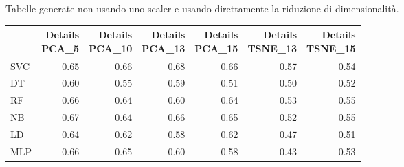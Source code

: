 \documentclass[12pt,italian]{report}
\begin{document}
Tabelle generate non usando uno scaler e usando direttamente la riduzione di dimensionalità.
\begin{table}[h]
	\begin{center}
		\begin{adjustbox}{max width=\textwidth}
			\begin{tabular}{lrrrrrr}
				\toprule
				{} &  \thead{Details\\PCA\_5} &  \thead{Details\\PCA\_10} &  \thead{Details\\PCA\_13} &  \thead{Details\\PCA\_15} &  \thead{Details\\TSNE\_13} &  \thead{Details\\TSNE\_15} \\
				\midrule
				SVC &                  0.65 &                   0.66 &                   \cellcolor{orange}0.68 &                   0.66 &                    0.57 &                    0.54 \\
				DT  &                  \cellcolor{cyan}0.60 &                   0.55 &                   0.59 &                   0.51 &                    0.50 &                    0.52 \\
				RF  &                  \cellcolor{cyan}0.66 &                   0.64 &                   0.60 &                   0.64 &                    0.53 &                    0.55 \\
				NB  &                  \cellcolor{cyan}0.67 &                   0.64 &                   0.66 &                   0.65 &                    0.52 &                    0.55 \\
				LD  &                  \cellcolor{cyan}0.64 &                   0.62 &                   0.58 &                   0.62 &                    0.47 &                    0.51 \\
				MLP &                  \cellcolor{cyan}0.66 &                   0.65 &                   0.60 &                   0.58 &                    0.43 &                    0.53 \\
				\bottomrule
			\end{tabular}
		\end{adjustbox}
	\end{center}
\end{table}
\end{document}
